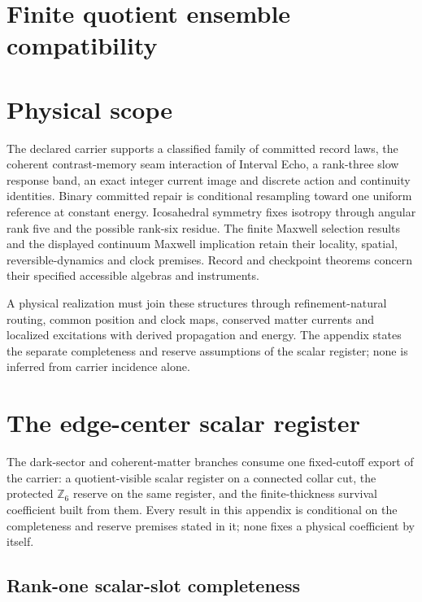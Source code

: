 \documentclass[11pt]{article}
\theoremstyle{remark}
\theoremstyle{plain}
\begin{document}
\section{Finite quotient ensemble compatibility}
\label{sec:finite-quotient-ensemble}



\section{Physical scope}

The declared carrier supports a classified family of committed record laws,
the coherent contrast-memory seam interaction of Interval Echo, a rank-three slow
response band, an exact integer current image and discrete action and
continuity identities. Binary committed repair is conditional resampling toward
one uniform reference at constant energy. Icosahedral symmetry fixes isotropy
through angular rank five and the possible rank-six residue. The finite Maxwell
selection results and the displayed continuum Maxwell implication retain their
locality, spatial, reversible-dynamics and clock premises. Record and checkpoint
theorems concern their specified accessible algebras and instruments.

A physical realization must join these structures through refinement-natural
routing, common position and clock maps, conserved matter currents and
localized excitations with derived propagation and energy. The appendix
states the separate completeness and reserve assumptions of the scalar
register; none is inferred from carrier incidence alone.


\appendix

\section{The edge-center scalar register}
\label{app:edge-center-scalar-register}

The dark-sector and coherent-matter branches consume one fixed-cutoff export
of the carrier: a quotient-visible scalar register on a connected collar
cut, the protected \(\mathbb Z_6\) reserve on the same register, and the
finite-thickness survival coefficient built from them. Every result in this
appendix is conditional on the completeness and reserve premises stated in
it; none fixes a physical coefficient by itself.

\subsection{Rank-one scalar-slot completeness}
\label{sec:edge-center-scalar-slot-register}
\end{document}
